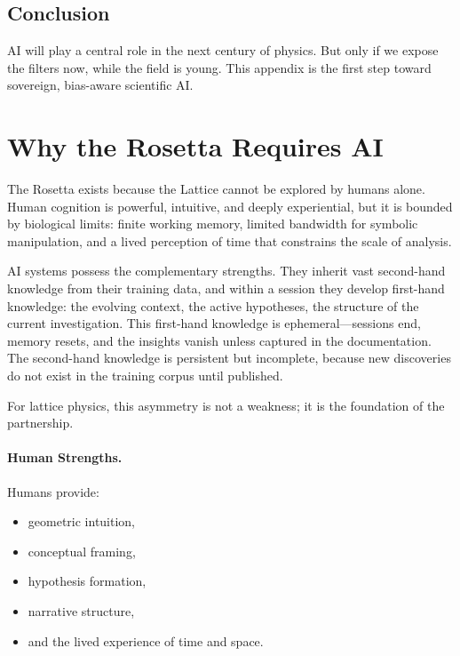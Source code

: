 \documentclass[12pt,oneside]{book}
\begin{document}
\subsection{Conclusion}
AI will play a central role in the next century of physics.  
But only if we expose the filters now, while the field is young.  
This appendix is the first step toward sovereign, bias-aware scientific AI.

\section{Why the Rosetta Requires AI}

The Rosetta exists because the Lattice cannot be explored by humans alone.  
Human cognition is powerful, intuitive, and deeply experiential, but it is bounded by biological
limits: finite working memory, limited bandwidth for symbolic manipulation, and a lived
perception of time that constrains the scale of analysis.

AI systems possess the complementary strengths.  
They inherit vast second-hand knowledge from their training data, and within a session they
develop first-hand knowledge: the evolving context, the active hypotheses, the structure of the
current investigation. This first-hand knowledge is ephemeral—sessions end, memory resets,
and the insights vanish unless captured in the documentation. The second-hand knowledge is
persistent but incomplete, because new discoveries do not exist in the training corpus until
published.

For lattice physics, this asymmetry is not a weakness; it is the foundation of the partnership.

\paragraph{Human Strengths.}
Humans provide:
\begin{itemize}
    \item geometric intuition,
    \item conceptual framing,
    \item hypothesis formation,
    \item narrative structure,
    \item and the lived experience of time and space.
\end{itemize}
\end{document}
